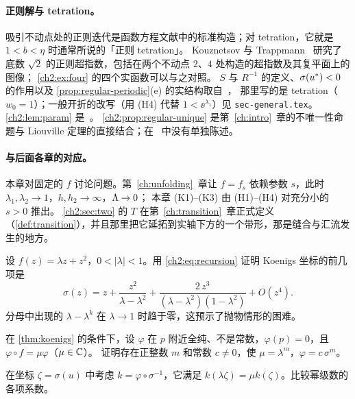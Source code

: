 \paragraph{正则解与 tetration。}
吸引不动点处的正则迭代是函数方程文献中的标准构造；对 tetration，它就是 $1<b<\eta$ 时通常所说的「正则 tetration」。
Kouznetsov 与 Trappmann~\cite{KouznetsovTrappmann2010} 研究了底数 $\sqrt2$ 的正则超指数，包括在两个不动点 $2$、$4$ 处构造的超指数及其复平面上的图像；
\cref{ch2:ex:four} 的四个实函数可以与之对照。
$S$ 与 $R^{-1}$ 的定义、$\sigma(u^{*})<0$ 的作用以及 \cref{prop:regular-periodic}(e) 的实结构取自~\cite[\S3.1]{KneserPaper}，
那里写的是 tetration（$w_0=1$）；一般开折的改写（用 (H4) 代替 $1<\ee^{\lambda_1}$）见 \texttt{sec-general.tex}。
\cref{ch2:lem:param} 是~\cite[Lemma~2.1]{KneserPaper}。
\cref{ch2:prop:regular-unique} 是第~\ref{ch:intro}~章的不唯一性命题与 Liouville 定理的直接结合；在~\cite{KneserPaper} 中没有单独陈述。

\paragraph{与后面各章的对应。}
本章对固定的 $f$ 讨论问题。第~\ref{ch:unfolding}~章让 $f=f_s$ 依赖参数 $s$，此时 $\lambda_1,\lambda_2\to1$，$h,h_2\to\infty$，$\Lambda\to0$；
本章 (K1)--(K3) 由 (H1)--(H4) 对充分小的 $s>0$ 推出。
\cref{ch2:sec:two} 的 $T$ 在第~\ref{ch:transition}~章正式定义（\cref{def:transition}），并且那里把它延拓到实轴下方的一个带形，那是缝合与汇流发生的地方。

\exercises

\begin{exercise}\label{ch2:ex:series}
设 $f(z)=\lambda z+z^2$，$0<|\lambda|<1$。用 \eqref{ch2:eq:recursion} 证明 Koenigs 坐标的前几项是
\[
  \sigma(z)=z+\frac{z^2}{\lambda-\lambda^2}+\frac{2\,z^3}{(\lambda-\lambda^2)(1-\lambda^2)}+O(z^4).
\]
分母中出现的 $\lambda-\lambda^k$ 在 $\lambda\to1$ 时趋于零，这预示了抛物情形的困难。
\end{exercise}

\begin{exercise}\label{ch2:ex:eigen}
在 \cref{thm:koenigs} 的条件下，设 $\varphi$ 在 $p$ 附近全纯、不是常数，$\varphi(p)=0$，且 $\varphi\circ f=\mu\varphi$（$\mu\in\mathbb{C}$）。
证明存在正整数 $m$ 和常数 $c\ne0$，使 $\mu=\lambda^m$，$\varphi=c\,\sigma^m$。
\end{exercise}
\begin{hint}
在坐标 $\zeta=\sigma(u)$ 中考虑 $k=\varphi\circ\sigma^{-1}$，它满足 $k(\lambda\zeta)=\mu k(\zeta)$。比较幂级数的各项系数。
\end{hint}

